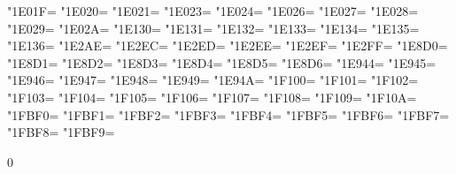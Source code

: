 \XeTeXcharclass"1E01F=\KclassNum
\XeTeXcharclass"1E020=\KclassNum
\XeTeXcharclass"1E021=\KclassNum
\XeTeXcharclass"1E023=\KclassNum
\XeTeXcharclass"1E024=\KclassNum
\XeTeXcharclass"1E026=\KclassNum
\XeTeXcharclass"1E027=\KclassNum
\XeTeXcharclass"1E028=\KclassNum
\XeTeXcharclass"1E029=\KclassNum
\XeTeXcharclass"1E02A=\KclassNum
\XeTeXcharclass"1E130=\KclassNum
\XeTeXcharclass"1E131=\KclassNum
\XeTeXcharclass"1E132=\KclassNum
\XeTeXcharclass"1E133=\KclassNum
\XeTeXcharclass"1E134=\KclassNum
\XeTeXcharclass"1E135=\KclassNum
\XeTeXcharclass"1E136=\KclassNum
\XeTeXcharclass"1E2AE=\KclassNum
\XeTeXcharclass"1E2EC=\KclassNum
\XeTeXcharclass"1E2ED=\KclassNum
\XeTeXcharclass"1E2EE=\KclassNum
\XeTeXcharclass"1E2EF=\KclassNum
\XeTeXcharclass"1E2FF=\KclassNum
\XeTeXcharclass"1E8D0=\KclassNum
\XeTeXcharclass"1E8D1=\KclassNum
\XeTeXcharclass"1E8D2=\KclassNum
\XeTeXcharclass"1E8D3=\KclassNum
\XeTeXcharclass"1E8D4=\KclassNum
\XeTeXcharclass"1E8D5=\KclassNum
\XeTeXcharclass"1E8D6=\KclassNum
\XeTeXcharclass"1E944=\KclassNum
\XeTeXcharclass"1E945=\KclassNum
\XeTeXcharclass"1E946=\KclassNum
\XeTeXcharclass"1E947=\KclassNum
\XeTeXcharclass"1E948=\KclassNum
\XeTeXcharclass"1E949=\KclassNum
\XeTeXcharclass"1E94A=\KclassNum
\XeTeXcharclass"1F100=\KclassNum
\XeTeXcharclass"1F101=\KclassNum
\XeTeXcharclass"1F102=\KclassNum
\XeTeXcharclass"1F103=\KclassNum
\XeTeXcharclass"1F104=\KclassNum
\XeTeXcharclass"1F105=\KclassNum
\XeTeXcharclass"1F106=\KclassNum
\XeTeXcharclass"1F107=\KclassNum
\XeTeXcharclass"1F108=\KclassNum
\XeTeXcharclass"1F109=\KclassNum
\XeTeXcharclass"1F10A=\KclassNum
\XeTeXcharclass"1FBF0=\KclassNum
\XeTeXcharclass"1FBF1=\KclassNum
\XeTeXcharclass"1FBF2=\KclassNum
\XeTeXcharclass"1FBF3=\KclassNum
\XeTeXcharclass"1FBF4=\KclassNum
\XeTeXcharclass"1FBF5=\KclassNum
\XeTeXcharclass"1FBF6=\KclassNum
\XeTeXcharclass"1FBF7=\KclassNum
\XeTeXcharclass"1FBF8=\KclassNum
\XeTeXcharclass"1FBF9=\KclassNum

 0{\intercharspace}
\XeTeXinterchartoks {}
\XeTeXinterchartoks {}
 \KclassNum{\intercharspace}
\XeTeXinterchartoks \KclassCM \KclassNum{\intercharspace}
